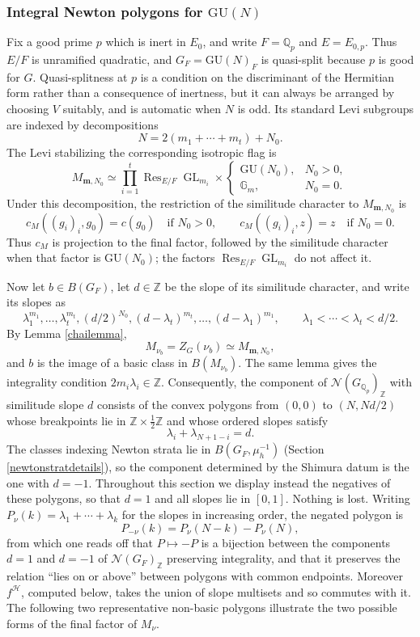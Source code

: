 \documentclass[11pt,a4paper]{article}
\theoremstyle{definition}
\theoremstyle{plain}
\theoremstyle{remark}
\theoremstyle{plain}
\DeclareMathOperator{\GL}{GL}
\DeclareMathOperator{\Res}{Res}
\begin{document}
\subsubsection{Integral Newton polygons for $\mathrm{GU}(N)$}
Fix a good prime $p$ which is inert in $E_0$, and write $F=\mathbb Q_p$ and $E=E_{0,p}$. Thus $E/F$ is unramified quadratic, and $G_F=\mathrm{GU}(N)_F$ is quasi-split because $p$ is good for $G$. Quasi-splitness at $p$ is a condition on the discriminant of the Hermitian form rather than a consequence of inertness, but it can always be arranged by choosing $V$ suitably, and is automatic when $N$ is odd. Its standard Levi subgroups are indexed by decompositions
$$
N=2(m_1+\cdots+m_t)+N_0.
$$
The Levi stabilizing the corresponding isotropic flag is
$$
M_{\boldsymbol m,N_0}\simeq
\prod_{i=1}^t\Res_{E/F}\GL_{m_i}\times
\begin{cases}
\mathrm{GU}(N_0),&N_0>0,\\
\mathbb G_m,&N_0=0.
\end{cases}
$$
Under this decomposition, the restriction of the similitude character to $M_{\boldsymbol m,N_0}$ is
$$
c_M((g_i)_i,g_0)=c(g_0)\quad\text{if }N_0>0,
\qquad
c_M((g_i)_i,z)=z\quad\text{if }N_0=0.
$$
Thus $c_M$ is projection to the final factor, followed by the similitude character when that factor is $\mathrm{GU}(N_0)$; the factors $\Res_{E/F}\GL_{m_i}$ do not affect it.

Now let $b\in B(G_F)$, let $d\in\mathbb Z$ be the slope of its similitude character, and write its slopes as
$$
\lambda_1^{m_1},\ldots,\lambda_t^{m_t},(d/2)^{N_0},
(d-\lambda_t)^{m_t},\ldots,(d-\lambda_1)^{m_1},
\qquad \lambda_1<\cdots<\lambda_t<d/2.
$$
By Lemma \ref{chailemma},
$$
M_{\nu_b}=Z_G(\nu_b)\simeq M_{\boldsymbol m,N_0},
$$
and $b$ is the image of a basic class in $B(M_{\nu_b})$. The same lemma gives the integrality condition $2m_i\lambda_i\in\mathbb Z$. Consequently, the component of $\mathcal N(G_{\mathbb Q_p})_{\mathbb Z}$ with similitude slope $d$ consists of the convex polygons from $(0,0)$ to $(N,Nd/2)$ whose breakpoints lie in $\mathbb Z\times\frac12\mathbb Z$ and whose ordered slopes satisfy
$$
\lambda_i+\lambda_{N+1-i}=d.
$$
The classes indexing Newton strata lie in $B(G_F,\mu_h^{-1})$ (Section \ref{newtonstratdetails}), so the component determined by the Shimura datum is the one with $d=-1$. Throughout this section we display instead the negatives of these polygons, so that $d=1$ and all slopes lie in $[0,1]$. Nothing is lost. Writing $P_{\nu}(k)=\lambda_1+\cdots+\lambda_k$ for the slopes in increasing order, the negated polygon is
$$
P_{-\nu}(k)=P_{\nu}(N-k)-P_{\nu}(N),
$$
from which one reads off that $P \mapsto -P$ is a bijection between the components $d=1$ and $d=-1$ of $\mathcal N(G_F)_{\mathbb Z}$ preserving integrality, and that it preserves the relation ``lies on or above'' between polygons with common endpoints. Moreover $f^{\mathcal H}$, computed below, takes the union of slope multisets and so commutes with it. The following two representative non-basic polygons illustrate the two possible forms of the final factor of $M_{\nu}$.
\end{document}
